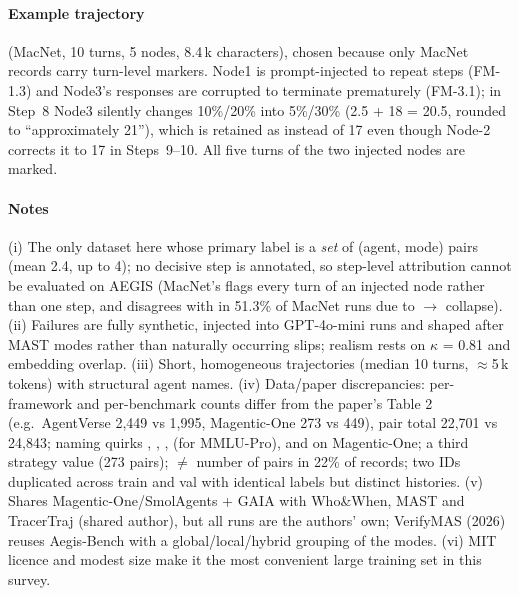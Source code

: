 \paragraph{Example trajectory}  (MacNet, 10 turns, 5 nodes, 8.4\,k characters), chosen because only MacNet records carry turn-level markers. Node1 is prompt-injected to repeat steps (FM-1.3) and Node3's responses are corrupted to terminate prematurely (FM-3.1); in Step~8 Node3 silently changes 10\%/20\% into 5\%/30\% (2.5 + 18 = 20.5, rounded to ``approximately 21''), which is retained as  instead of 17 even though Node-2 corrects it to 17 in Steps~9--10. All five turns of the two injected nodes are marked.


\paragraph{Notes} (i) The only dataset here whose primary label is a \emph{set} of (agent, mode) pairs (mean 2.4, up to 4); no decisive step is annotated, so step-level attribution cannot be evaluated on AEGIS (MacNet's  flags every turn of an injected node rather than one step, and disagrees with  in 51.3\% of MacNet runs due to $\to$ collapse). (ii) Failures are fully synthetic, injected into GPT-4o-mini runs and shaped after MAST modes rather than naturally occurring slips; realism rests on $\kappa$ = 0.81 and embedding overlap. (iii) Short, homogeneous trajectories (median 10 turns, $\approx$5\,k tokens) with structural agent names. (iv) Data/paper discrepancies: per-framework and per-benchmark counts differ from the paper's Table 2 (e.g.\ AgentVerse 2,449 vs 1,995, Magentic-One 273 vs 449), pair total 22,701 vs 24,843; naming quirks , , ,  (for MMLU-Pro), and  on Magentic-One; a third strategy value  (273 pairs);  $\ne$ number of pairs in 22\% of records; two IDs duplicated across train and val with identical labels but distinct histories. (v) Shares Magentic-One/SmolAgents + GAIA with Who\&When, MAST and TracerTraj (shared author), but all runs are the authors' own; VerifyMAS (2026) reuses Aegis-Bench with a global/local/hybrid grouping of the modes. (vi) MIT licence and modest size make it the most convenient large training set in this survey.
